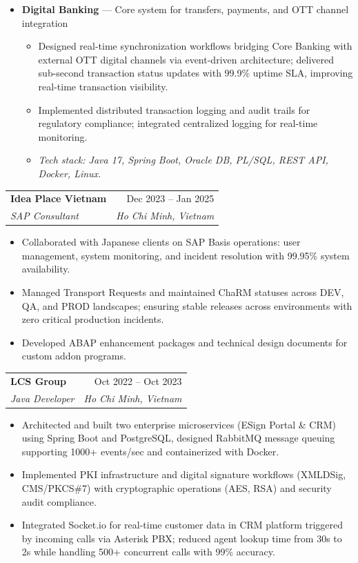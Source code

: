 \documentclass[letterpaper,11pt]{article}
\makeatletter
\newcommand{\resumeItem}[1]{
  \item\small{{#1\vspace{-1pt}}}
}
\newcommand{\resumeSubheading}[4]{
  \vspace{-2pt}\item
    \begin{tabular*}{0.97\textwidth}[t]{l@{\extracolsep{\fill}}r}
      \textbf{\small #1} & \small #2 \\
      \textit{\small\color{accent} #3} & \textit{\small #4} \\
    \end{tabular*}\vspace{-5pt}
}
\newcommand{\techStack}[1]{%
  \vspace{1pt}
  {\small\textit{Tech stack: #1}}%
}
\newcommand{\resumeItemListStart}{%
  \begin{itemize}[leftmargin=0.22in, topsep=2pt, parsep=0pt, partopsep=0pt, itemsep=2pt]%
}
\newcommand{\resumeItemListEnd}{\end{itemize}\vspace{-2pt}}
\newenvironment{projectBlock}[2]{%
  \vspace{-4pt}
  \begin{itemize}[leftmargin=0.22in, label={}, topsep=0pt, parsep=0pt, itemsep=0pt]
  \item \small\textbf{#1} --- #2
  \begin{itemize}[leftmargin=0.18in, topsep=1pt, parsep=0pt, itemsep=1pt]
}{%
  \end{itemize}
  \end{itemize}
  \vspace{-2pt}
}
\makeatother
\begin{document}
  \begin{projectBlock}{Digital Banking}{Core system for transfers, payments, and OTT channel integration}
    \resumeItem{Designed real-time synchronization workflows bridging Core Banking with external OTT digital channels via event-driven architecture; delivered sub-second transaction status updates with 99.9\% uptime SLA, improving real-time transaction visibility.}
    \resumeItem{Implemented distributed transaction logging and audit trails for regulatory compliance; integrated centralized logging for real-time monitoring.}
    \item \techStack{Java 17, Spring Boot, Oracle DB, PL/SQL, REST API, Docker, Linux.}
  \end{projectBlock}

  \resumeSubheading
    {Idea Place Vietnam}{Dec 2023 -- Jan 2025}
    {SAP Consultant}{Ho Chi Minh, Vietnam}
  \resumeItemListStart
    \resumeItem{Collaborated with Japanese clients on SAP Basis operations: user management, system monitoring, and incident resolution with 99.95\% system availability.}
    \resumeItem{Managed Transport Requests and maintained ChaRM statuses across DEV, QA, and PROD landscapes; ensuring stable releases across environments with zero critical production incidents.}
    \resumeItem{Developed ABAP enhancement packages and technical design documents for custom addon programs.}
  \resumeItemListEnd

  \resumeSubheading
    {LCS Group}{Oct 2022 -- Oct 2023}
    {Java Developer}{Ho Chi Minh, Vietnam}
  \resumeItemListStart
    \resumeItem{Architected and built two enterprise microservices (ESign Portal \& CRM) using Spring Boot and PostgreSQL, designed RabbitMQ message queuing supporting 1000+ events/sec and containerized with Docker.}
    \resumeItem{Implemented PKI infrastructure and digital signature workflows (XMLDSig, CMS/PKCS\#7) with cryptographic operations (AES, RSA) and security audit compliance.}
    \resumeItem{Integrated Socket.io for real-time customer data in CRM platform triggered by incoming calls via Asterisk PBX; reduced agent lookup time from 30s to 2s while handling 500+ concurrent calls with 99\% accuracy.}
  \resumeItemListEnd
\end{document}
